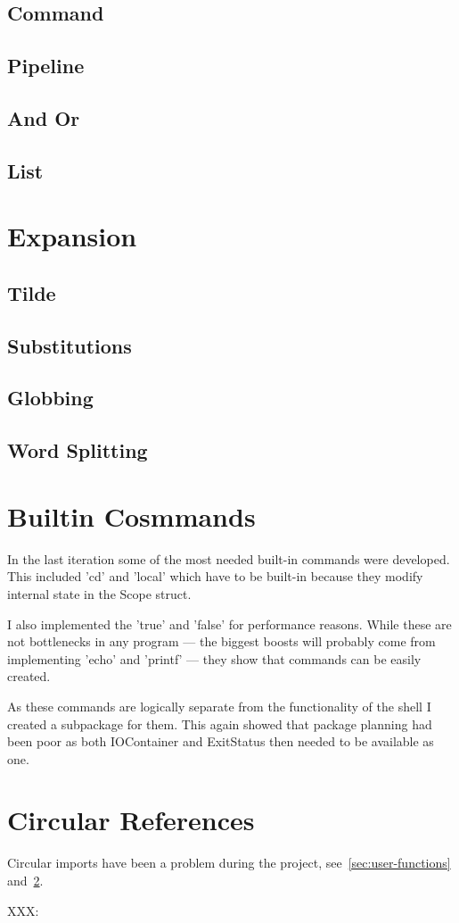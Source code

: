 \subsection{Command}
\subsection{Pipeline}
\subsection{And Or}
\subsection{List}

\section{Expansion}

\subsection{Tilde}
\subsection{Substitutions}
\subsection{Globbing}
\subsection{Word Splitting}

\section{Builtin Cosmmands}
\label{sec:builtins}
In the last iteration some of the most needed built-in commands were developed.
This included 'cd' and 'local' which have to be built-in because they modify internal state in the Scope struct. 

I also implemented the 'true' and 'false' for performance reasons.
While these are not bottlenecks in any program --- the biggest boosts will probably come from implementing 'echo' and 'printf' --- they show that commands can be easily created.

As these commands are logically separate from the functionality of the shell I created a subpackage for them.
This again showed that package planning had been poor as both IOContainer and ExitStatus then needed to be available as one.

\section{Circular References}
\label{sec:circular-refs}
Circular imports have been a problem during the project, see~\ref{sec:user-functions} and~\ref{sec:builtins}.




XXX: %